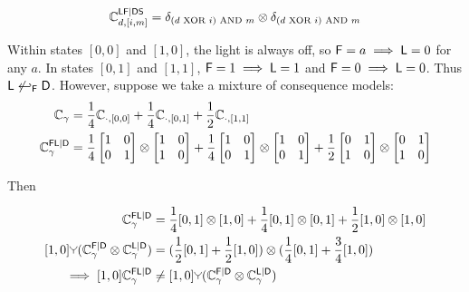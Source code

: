 \begin{align}
    \mathbb{C}^{\mathsf{L}\mathsf{F}|\mathsf{D}\mathsf{S}}_{d,[i,m]} = \delta_{(d\text{ XOR }i)\text{ AND }m}\otimes \delta_{(d\text{ XOR }i)\text{ AND }m}
\end{align}

Within states $[0,0]$ and $[1,0]$, the light is always off, so $\mathsf{F}=a\implies \mathsf{L}=0$ for any $a$. In states $[0,1]$ and $[1,1]$, $\mathsf{F}=1\implies \mathsf{L}=1$ and $\mathsf{F}=0\implies \mathsf{L}=0$. Thus $\mathsf{L}\not\hookleftarrow_{\mathsf{F}} \mathsf{D}$. However, suppose we take a mixture of consequence models:
\begin{align}
    \mathbb{C}_\gamma &= \frac{1}{4}\mathbb{C}_{\cdot,[0,0]} + \frac{1}{4}\mathbb{C}_{\cdot,[0,1]} + \frac{1}{2}\mathbb{C}_{\cdot,[1,1]}\\
    \mathbb{C}^{\mathsf{F}\mathsf{L}|\mathsf{D}}_\gamma &= \frac{1}{4} \left[\begin{matrix}
                        1 & 0\\ 0 & 1
                      \end{matrix}\right]\otimes \left[\begin{matrix}
                        1 & 0\\ 1 & 0
                      \end{matrix}\right] + \frac{1}{4} \left[\begin{matrix}
                        1 & 0\\ 0 & 1
                      \end{matrix}\right]\otimes \left[\begin{matrix}
                        1 & 0\\ 0 & 1
                      \end{matrix}\right] + \frac{1}{2}\left[\begin{matrix}
                        0 & 1\\ 1 & 0
                      \end{matrix}\right]\otimes \left[\begin{matrix}
                        0 & 1\\ 1 & 0
                      \end{matrix}\right]
\end{align}

Then

\begin{align}
    [1,0]\kernel{C}^{\RV{F}\RV{L}|\RV{D}}_{\gamma} &= \frac{1}{4}[0,1]\otimes[1,0]+\frac{1}{4}[0,1]\otimes[0,1]+\frac{1}{2}[1,0]\otimes[1,0]\\
    [1,0]\splitter{0.1}(\kernel{C}^{\RV{F}|\RV{D}}_\gamma\otimes \kernel{C}^{\RV{L}|\RV{D}}_\gamma) &= (\frac{1}{2}[0,1]+\frac{1}{2}[1,0])\otimes(\frac{1}{4}[0,1]+\frac{3}{4}[1,0])\\
    \implies [1,0]\kernel{C}^{\RV{F}\RV{L}|\RV{D}}_{\gamma} &\neq [1,0] \splitter{0.1} (\kernel{C}^{\RV{F}|\RV{D}}_\gamma\otimes \kernel{C}^{\RV{L}|\RV{D}}_\gamma)
\end{align}

